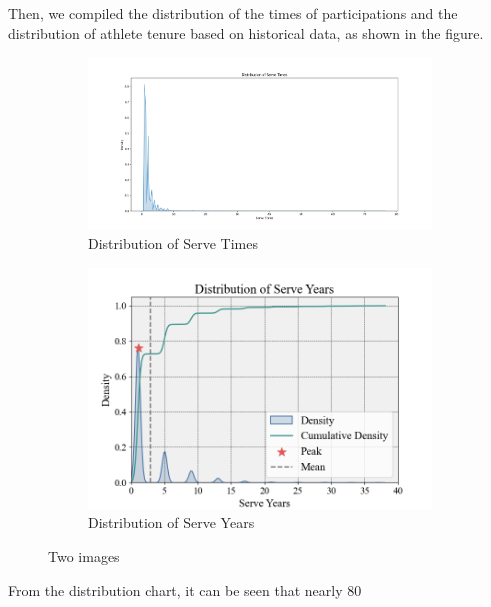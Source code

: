\documentclass[12pt]{article}  %
\begin{document}
Then, we compiled the distribution of the times of participations and the distribution of athlete tenure based on historical data, as shown in the figure.
\begin{figure}[htbp]
	\centering
	\begin{subfigure}[b]{.55\textwidth}
		\includegraphics[width=\textwidth]{img/Times.png}
		\caption{Distribution of Serve Times}\label{subfig:left}
	\end{subfigure}
	\begin{subfigure}[b]{.4\textwidth}
		\includegraphics[width=\textwidth]{img/Years.png}
		\caption{Distribution of Serve Years}\label{subfig:right}
	\end{subfigure}
	\caption{Two images}\label{fig:subfigures}
\end{figure}


From the distribution chart, it can be seen that nearly 80%
\end{document}
